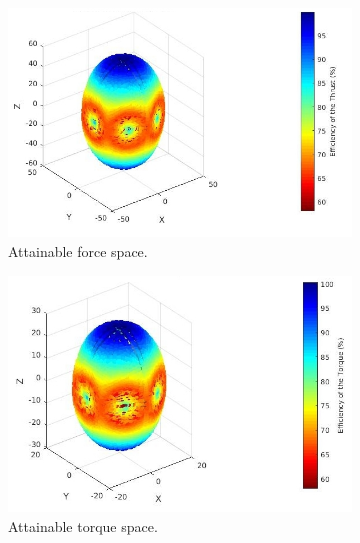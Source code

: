 \begin{figure}[!ht]
  \begin{center}
  \begin{subfigure}[b]{0.5\textwidth}
    \includegraphics[width=\linewidth]{images/Voliro_fspace.jpg}
    \caption{Attainable force space.} \label{fig:voliro_fspace}
  \end{subfigure}
  \hspace*{\fill} %
  \begin{subfigure}[b]{0.47\textwidth}
    \includegraphics[width=\linewidth]{images/Voliro_tspace.jpg}
    \caption{Attainable torque space.} \label{fig:voliro_tspace}
  \end{subfigure}
  \begin{subfigure}[b]{0.5\textwidth}

\end{subfigure}
\end{center}
\end{figure}
